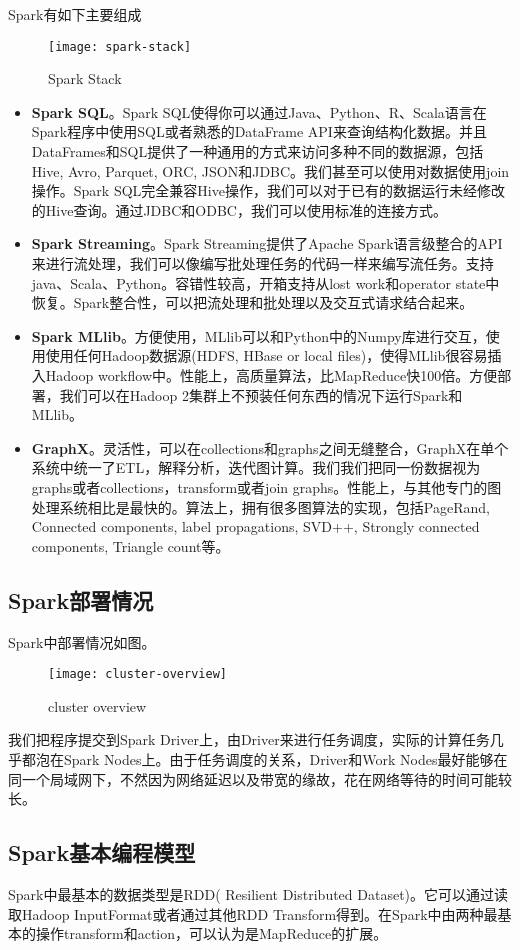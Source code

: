 Spark有如下主要组成
\begin{figure}[ht]
\centering
\texttt{[image: spark-stack]}
\caption{Spark Stack}
\end{figure}
\begin{itemize}
    \item \textbf{Spark SQL}。Spark SQL使得你可以通过Java、Python、R、Scala语言在Spark程序中使用SQL或者熟悉的DataFrame API来查询结构化数据。并且DataFrames和SQL提供了一种通用的方式来访问多种不同的数据源，包括Hive, Avro, Parquet, ORC, JSON和JDBC。我们甚至可以使用对数据使用join操作。Spark SQL完全兼容Hive操作，我们可以对于已有的数据运行未经修改的Hive查询。通过JDBC和ODBC，我们可以使用标准的连接方式。
    \item \textbf{Spark Streaming}。Spark Streaming提供了Apache Spark语言级整合的API来进行流处理，我们可以像编写批处理任务的代码一样来编写流任务。支持java、Scala、Python。容错性较高，开箱支持从lost work和operator state中恢复。Spark整合性，可以把流处理和批处理以及交互式请求结合起来。
    \item \textbf{Spark MLlib}。方便使用，MLlib可以和Python中的Numpy库进行交互，使用使用任何Hadoop数据源(HDFS, HBase or local files)，使得MLlib很容易插入Hadoop workflow中。性能上，高质量算法，比MapReduce快100倍。方便部署，我们可以在Hadoop 2集群上不预装任何东西的情况下运行Spark和MLlib。
    \item \textbf{GraphX}。灵活性，可以在collections和graphs之间无缝整合，GraphX在单个系统中统一了ETL，解释分析，迭代图计算。我们我们把同一份数据视为graphs或者collections，transform或者join graphs。性能上，与其他专门的图处理系统相比是最快的。算法上，拥有很多图算法的实现，包括PageRand, Connected components, label propagations, SVD++, Strongly connected components, Triangle count等。
\end{itemize}

\subsection{Spark部署情况}
Spark中部署情况如图。
\begin{figure}[ht]
\centering
\texttt{[image: cluster-overview]}
\caption{cluster overview}
\end{figure}
我们把程序提交到Spark Driver上，由Driver来进行任务调度，实际的计算任务几乎都泡在Spark Nodes上。由于任务调度的关系，Driver和Work Nodes最好能够在同一个局域网下，不然因为网络延迟以及带宽的缘故，花在网络等待的时间可能较长。
\subsection{Spark基本编程模型}
Spark中最基本的数据类型是RDD( Resilient Distributed Dataset)。它可以通过读取Hadoop InputFormat或者通过其他RDD Transform得到。在Spark中由两种最基本的操作transform和action，可以认为是MapReduce的扩展。

